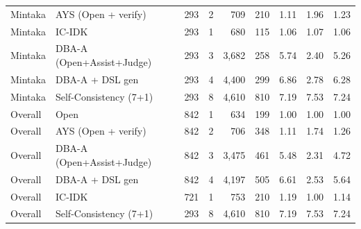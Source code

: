 \begin{table}[t]
\begin{tabular}{llrrrrrrr}
Mintaka & AYS (Open + verify) & 293 & 2 & 709 & 210 & 1.11 & 1.96 & 1.23 \\
Mintaka & IC-IDK & 293 & 1 & 680 & 115 & 1.06 & 1.07 & 1.06 \\
Mintaka & DBA-A (Open+Assist+Judge) & 293 & 3 & 3,682 & 258 & 5.74 & 2.40 & 5.26 \\
Mintaka & DBA-A + DSL gen & 293 & 4 & 4,400 & 299 & 6.86 & 2.78 & 6.28 \\
Mintaka & Self-Consistency (7+1) & 293 & 8 & 4,610 & 810 & 7.19 & 7.53 & 7.24 \\
\midrule
Overall & Open & 842 & 1 & 634 & 199 & 1.00 & 1.00 & 1.00 \\
Overall & AYS (Open + verify) & 842 & 2 & 706 & 348 & 1.11 & 1.74 & 1.26 \\
Overall & DBA-A (Open+Assist+Judge) & 842 & 3 & 3,475 & 461 & 5.48 & 2.31 & 4.72 \\
Overall & DBA-A + DSL gen & 842 & 4 & 4,197 & 505 & 6.61 & 2.53 & 5.64 \\
Overall & IC-IDK & 721 & 1 & 753 & 210 & 1.19 & 1.00 & 1.14 \\
Overall & Self-Consistency (7+1) & 293 & 8 & 4,610 & 810 & 7.19 & 7.53 & 7.24 \\
\bottomrule
\end{tabular}
\end{table}
